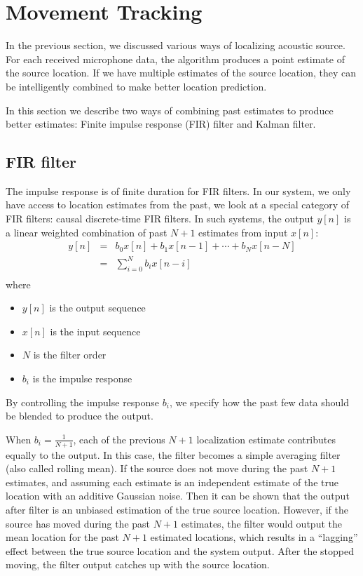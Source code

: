 \section{Movement Tracking}
In the previous section, we discussed various ways of localizing acoustic source. For each received microphone data, the algorithm produces a point estimate of the source location. If we have multiple estimates of the source location, they can be intelligently combined to make better location prediction. 

In this section we describe two ways of combining past estimates to produce better estimates: Finite impulse response (FIR) filter and Kalman filter.

\subsection{FIR filter}
The impulse response is of finite duration for FIR filters. In our system, we only have access to location estimates from the past, we look at a special category of FIR filters: causal discrete-time FIR filters. In such systems, the output $y[n]$ is a linear weighted combination of past $N+1$ estimates from input $x[n]$:
\begin{eqnarray}
y[n] & = & b_0x[n] + b_1x[n-1] + \cdots + b_Nx[n-N]\\
& = & \sum_{i=0}^N b_i x[n-i]\\
\end{eqnarray}
where
\begin{itemize}
\item $y[n]$ is the output sequence
\item $x[n]$ is the input sequence
\item $N$ is the filter order
\item $b_i$ is the impulse response
\end{itemize}

By controlling the impulse response $b_i$, we specify how the past few data should be blended to produce the output. 

When $b_i=\frac{1}{N+1}$, each of the previous $N+1$ localization estimate contributes equally to the output. In this case, the filter becomes a simple averaging filter (also called rolling mean). If the source does not move during the past $N+1$ estimates, and assuming each estimate is an independent estimate of the true location with an additive Gaussian noise. Then it can be shown that the output after filter is an unbiased estimation of the true source location. However, if the source has moved during the past $N+1$ estimates, the filter would output the mean location for the past $N+1$ estimated locations, which results in a ``lagging'' effect between the true source location and the system output. After the stopped moving, the filter output catches up with the source location. 

